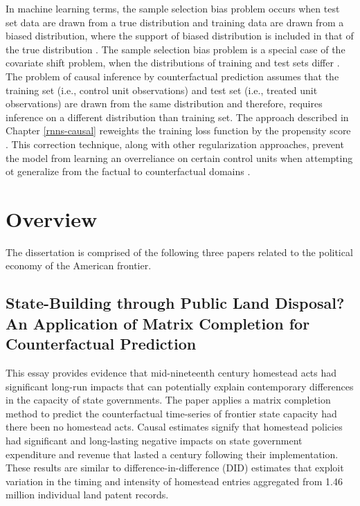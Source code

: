 In machine learning terms, the sample selection bias problem occurs when test set data are drawn from a true distribution and training data are drawn from a biased distribution, where the support of biased distribution is included in that of the true distribution \citep{cortes2008sample}. The sample selection bias problem is a special case of the covariate shift problem, when the distributions of training and test sets differ \citep{bickel2007discriminative}. The problem of causal inference by counterfactual prediction assumes that the training set (i.e., control unit observations) and test set (i.e., treated unit observations) are drawn from the same distribution and therefore, requires inference on a different distribution than training set. The approach described in Chapter \ref{rnns-causal} reweights the training loss function by the propensity score \citep{rosenbaum1983central}. This correction technique, along with other regularization approaches, prevent the model from learning an overreliance on certain control units when attempting ot generalize from the factual to counterfactual domains \citep{johansson2016learning}.
	
\section{Overview}

The dissertation is comprised of the following three papers related to the political economy of the American frontier. 

\subsection{State-Building through Public Land Disposal? An Application of Matrix Completion for Counterfactual Prediction}
This essay provides evidence that mid-nineteenth century homestead acts had significant long-run impacts that can potentially explain contemporary differences in the capacity of state governments. The paper applies a matrix completion method to predict the counterfactual time-series of frontier state capacity had there been no homestead acts. Causal estimates signify that homestead policies had significant and long-lasting negative impacts on state government expenditure and revenue that lasted a century following their implementation. These results are similar to difference-in-difference (DID) estimates that exploit variation in the timing and intensity of homestead entries aggregated from 1.46 million individual land patent records.

